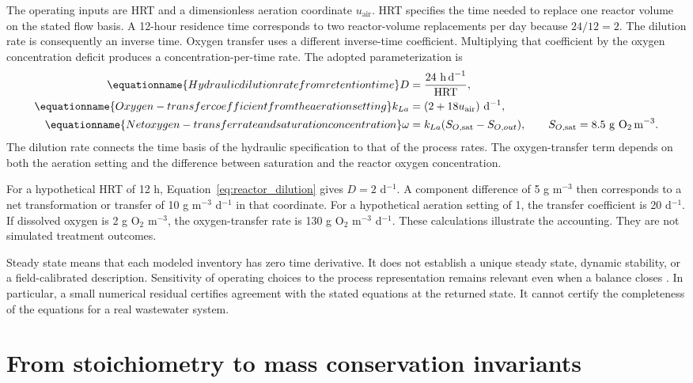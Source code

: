 The operating inputs are HRT and a dimensionless aeration coordinate $u_{\mathrm{air}}$. HRT specifies the time needed to replace one reactor volume on the stated flow basis. A 12-hour residence time corresponds to two reactor-volume replacements per day because $24/12=2$. The dilution rate is consequently an inverse time. Oxygen transfer uses a different inverse-time coefficient. Multiplying that coefficient by the oxygen concentration deficit produces a concentration-per-time rate. The adopted parameterization is
\begin{align}
\equationname{Hydraulic dilution rate from retention time}
D&=\frac{24\ \mathrm{h\,d}^{-1}}{\mathrm{HRT}},\label{eq:reactor_dilution}\\
\equationname{Oxygen-transfer coefficient from the aeration setting}
k_{La}&=(2+18u_{\mathrm{air}})\ \mathrm{d}^{-1},\label{eq:reactor_transfer_coefficient}\\
\equationname{Net oxygen-transfer rate and saturation concentration}
\omega&=k_{La}(S_{O,\mathrm{sat}}-S_{O,out}),\qquad
S_{O,\mathrm{sat}}=8.5\ \mathrm{g\ O_2\,m}^{-3}.
\label{eq:reactor_oxygen_transfer}
\end{align}
The dilution rate connects the time basis of the hydraulic specification to that of the process rates. The oxygen-transfer term depends on both the aeration setting and the difference between saturation and the reactor oxygen concentration.

For a hypothetical HRT of 12 h, Equation~\eqref{eq:reactor_dilution} gives $D=2$ d$^{-1}$. A component difference of 5 g m$^{-3}$ then corresponds to a net transformation or transfer of 10 g m$^{-3}$ d$^{-1}$ in that coordinate. For a hypothetical aeration setting of 1, the transfer coefficient is 20 d$^{-1}$. If dissolved oxygen is 2 g O$_2$ m$^{-3}$, the oxygen-transfer rate is 130 g O$_2$ m$^{-3}$ d$^{-1}$. These calculations illustrate the accounting. They are not simulated treatment outcomes.

Steady state means that each modeled inventory has zero time derivative. It does not establish a unique steady state, dynamic stability, or a field-calibrated description. Sensitivity of operating choices to the process representation remains relevant even when a balance closes \citep{Araujo2013}. In particular, a small numerical residual certifies agreement with the stated equations at the returned state. It cannot certify the completeness of the equations for a real wastewater system.

\section{From stoichiometry to mass conservation invariants}

